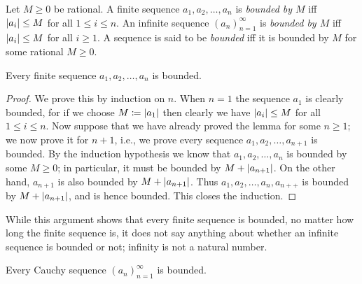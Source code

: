 \begin{defn}\label{5.1.12}
  Let \(M \geq 0\) be rational.
  A finite sequence \(a_1, a_2, \dots, a_n\) is \emph{bounded by \(M\)} iff \(\left\lvert a_i\right\rvert \leq M\) for all \(1 \leq i \leq n\).
  An infinite sequence \((a_n)_{n = 1}^{\infty}\) is \emph{bounded by \(M\)} iff \(\left\lvert a_i\right\rvert \leq M\) for all \(i \geq 1\).
  A sequence is said to be \emph{bounded} iff it is bounded by \(M\) for some rational \(M \geq 0\).
\end{defn}

\setcounter{thm}{13}
\begin{lem}\label{5.1.14}
  Every finite sequence \(a_1, a_2, \dots, a_n\) is bounded.
\end{lem}

\begin{proof}
  We prove this by induction on \(n\).
  When \(n = 1\) the sequence \(a_1\) is clearly bounded, for if we choose \(M \coloneqq \left\lvert a_1\right\rvert\) then clearly we have \(\left\lvert a_i\right\rvert \leq M\) for all \(1 \leq i \leq n\).
  Now suppose that we have already proved the lemma for some \(n \geq 1\);
  we now prove it for \(n + 1\), i.e., we prove every sequence \(a_1, a_2, \dots, a_{n + 1}\) is bounded.
  By the induction hypothesis we know that \(a_1, a_2, \dots, a_n\) is bounded by some \(M \geq 0\);
  in particular, it must be bounded by \(M + \left\lvert a_{n + 1}\right\rvert\).
  On the other hand, \(a_{n + 1}\) is also bounded by \(M + \left\lvert a_{n + 1}\right\rvert\).
  Thus \(a_1, a_2, \dots, a_n, a_{n++}\) is bounded by \(M + \left\lvert a_{n + 1}\right\rvert\), and is hence bounded.
  This closes the induction.
\end{proof}

\begin{note}
  While this argument shows that every finite sequence is bounded, no matter how long the finite sequence is, it does not say anything about whether an infinite sequence is bounded or not;
  infinity is not a natural number.
\end{note}

\begin{lem}\label{5.1.15}
  Every Cauchy sequence \((a_n)_{n = 1}^{\infty}\) is bounded.
\end{lem}

